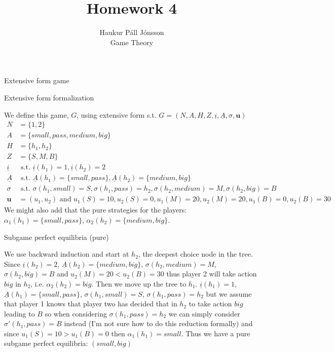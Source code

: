 \documentclass[12pt]{article}
\newenvironment{question}[2][Question]{\begin{trivlist}
\item[\hskip \labelsep {\bfseries #1}\hskip \labelsep {\bfseries #2.}]}{\end{trivlist}}
\newenvironment{answer}[2][Answer]{\begin{trivlist}
\item[\hskip \labelsep {\bfseries #1}\hskip \labelsep {\bfseries #2:}]}{\end{trivlist}}
\begin{document}
\let\oldsum\sum
\renewcommand{\sum}[3]{\oldsum\limits_{#1}^{#2}#3}
\let\oldprod\prod
\renewcommand{\prod}[3]{\oldprod\limits_{#1}^{#2}#3}

\title{Homework 4}
\author{Haukur Páll Jónsson\\
Game Theory}

\maketitle

\begin{question}{1}
Extensive form game
\end{question}
\begin{answer}{a)}{Extensive form formalization}

We define this game, $G$, using extensive form s.t. $G=(N, A, H, Z, \underline{i}, \underline{A}, \sigma, \boldsymbol{u})$
\begin{align*}
N&=\{1,2\} \\
A&=\{small,pass,medium, big\} \\
H&=\{h_1,h_2\} \\
Z&=\{S,M,B\}  \\
\underline{i}& \text{ s.t. } \underline{i}(h_1)=1, \underline{i}(h_2)=2  \\
\underline{A}& \text{ s.t. } \underline{A}(h_1)=\{small,pass\}, \underline{A}(h_2)=\{medium,big\} \\
\sigma& \text{ s.t. } \sigma(h_1,small)=S, \sigma(h_1,pass)=h_2, \sigma(h_2,medium)=M, \sigma(h_2,big)=B \\
\boldsymbol{u}&=(u_1,u_2) \text{ and } u_1(S)=10, u_2(S)=0, u_1(M)=20, u_2(M)=20, u_1(B)=0, u_2(B)=30
\end{align*}
We might also add that the pure strategies for the players: $\alpha_1(h_1)=\{small, pass\}$, $\alpha_2(h_2)=\{medium, big\}$.
\end{answer}
\begin{answer}{b)}{Subgame perfect equilibria (pure)}

We use backward induction and start at $h_2$, the deepest choice node in the tree. Since $\underline{i}(h_2)=2$, $\underline{A}(h_2)=\{medium,big\}$, $\sigma(h_2,medium)=M$, $\sigma(h_2,big)=B$ and $u_2(M)=20 < u_2(B)=30$ thus player 2 will take action $big$ in $h_2$, i.e. $\alpha_2(h_2)=big$. Then we move up the tree to $h_1$. $\underline{i}(h_1)=1$, $\underline{A}(h_1)=\{small,pass\}$, $\sigma(h_1,small)=S$, $\sigma(h_1,pass)=h_2$ but we assume that player 1 knows that player two has decided that in $h_2$ to take action $big$ leading to $B$ so when considering $\sigma(h_1,pass)=h_2$ we can simply consider $\sigma'(h_1,pass)=B$ instead (I'm not sure how to do this reduction formally) and since $u_1(S)=10 > u_1(B)=0$ then $\alpha_1(h_1)=small$. Thus we have a pure subgame perfect equilibria: $(small,big)$
\end{answer}
\end{document}
